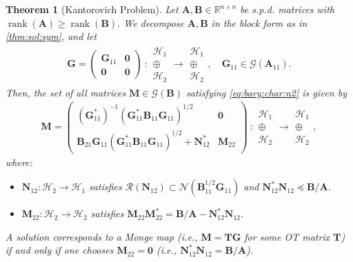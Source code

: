 \documentclass[noinfoline]{imsart}\setcounter{tocdepth}{2}
\renewcommand{\b}[1]{\mathbb{#1}} %
\newcommand{\m}[1]{\mathbf{#1}} %
\newcommand{\s}[1]{\mathscr{#1}} %
\renewcommand{\c}[1]{\mathcal{#1}} %
\DeclareMathOperator*{\rk}{rank}
\theoremstyle{plain}
\newtheorem{theorem}{Theorem}[section]
\begin{document}
\begin{theorem}[Kantorovich Problem]\label{thm:Kanto:char}
Let $\m{A}, \m{B}  \in \b{R}^{n \times n}$ be s.p.d. matrices with $\rk(\m{A}) \geq \rk(\m{B})$. We decompose $\m{A}, \m{B}$ in the block form as in 
\cref{thm:sol:sym}, and let
\begin{align*}
    \m{G} =
    \begin{pmatrix}
    \m{G}_{11} & \m{0} \\
    \m{0} & \m{0}
    \end{pmatrix}
    \    :
    \begin{array}{c}
    \c{H}_{1} \\
    \oplus \\
    \c{H}_{2}
    \end{array}
    \rightarrow
    \begin{array}{c}
    \c{H}_{1} \\
    \oplus \\
    \c{H}_{2}
    \end{array}, \quad \m{G}_{11} \in \c{G}(\m{A}_{11}).
\end{align*}
Then, the set of all matrices $\m{M} \in \s{G}(\m{B})$ satisfying \eqref{eq:bary:char:n2} is given by
\begin{align*}
    \m{M} =
    \begin{pmatrix}
    (\m{G}_{11}^{*})^{-1} (\m{G}_{11}^{*} \m{B}_{11} \m{G}_{11})^{1/2} & \m{0} \\
    \m{B}_{21} \m{G}_{11} (\m{G}_{11}^{*} \m{B}_{11} \m{G}_{11})^{\dagger/2} + \m{N}_{12}^{*} & \m{M}_{22}
    \end{pmatrix}
    \    :
    \begin{array}{c}
    \c{H}_{1} \\
    \oplus \\
    \c{H}_{2}
    \end{array}
    \rightarrow
    \begin{array}{c}
    \c{H}_{1} \\
    \oplus \\
    \c{H}_{2}
    \end{array} ,
\end{align*}
where: 
\begin{itemize}[leftmargin = *]
    \item $\m{N}_{12}  : \c{H}_{2} \to \c{H}_{1}$ satisfies $\c{R}(\m{N}_{12}) \subset \c{N}(\m{B}_{11}^{1/2} \m{G}_{11})$ and $\m{N}_{12}^{*} \m{N}_{12} \preceq \m{B}/\m{A}$.
    \item $\m{M}_{22}  : \c{H}_{2} \to \c{H}_{2}$ satisfies $\m{M}_{22} \m{M}_{22}^{*} = \m{B}/\m{A} - \m{N}_{12}^{*} \m{N}_{12}$.
\end{itemize}
A solution corresponds to a Monge map (i.e., $\m{M} = \m{T}\m{G}$ for some OT matrix $\m{T}$) if and only if one chooses $\m{M}_{22} = \m{0}$ (i.e., $\m{N}_{12}^{*} \m{N}_{12} = \m{B}/\m{A}$).
\end{theorem}
\end{document}

